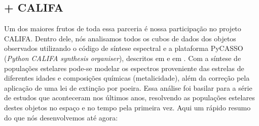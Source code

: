 \subsection{\starlight + CALIFA}
\label{sec:intro:UFSCeIAA:SLCAL}
Um dos maiores frutos de toda essa parceria é nossa participação no projeto CALIFA. Dentro dele, nós analisamos todos os cubos de dados dos objetos observados utilizando o código de síntese espectral \starlight e a plataforma PyCASSO ({\em Python CALIFA \starlight synthesis organiser}), descritos em \citet{CidFernandes.etal.2013a, CidFernandes.etal.2014a} e em \citet{deAmorim.etal.2017}. Com a síntese de populações estelares pode-se modelar os espectros proveniente das estrelas de diferentes idades e composições químicas (metalicidade), além da correção pela aplicação de uma lei de extinção por poeira. Essa análise foi basilar para a série de estudos que aconteceram nos últimos anos, resolvendo as populações estelares destes objetos no espaço e no tempo pela primeira vez. Aqui um rápido resumo do que nós desenvolvemos até agora:

